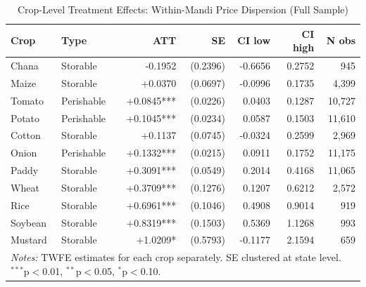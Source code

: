 \begin{table}[htbp]
\centering
\caption{Crop-Level Treatment Effects: Within-Mandi Price Dispersion (Full Sample)}
\label{tab:crop_het}
\begin{tabular}{llrrrrr}
\hline\hline
Crop & Type & ATT & SE & CI low & CI high & N obs \\
\hline
Chana & Storable & -0.1952 & (0.2396) & -0.6656 & 0.2752 & 945 \\
Maize & Storable & +0.0370 & (0.0697) & -0.0996 & 0.1735 & 4,399 \\
Tomato & Perishable & +0.0845*** & (0.0226) & 0.0403 & 0.1287 & 10,727 \\
Potato & Perishable & +0.1045*** & (0.0234) & 0.0587 & 0.1503 & 11,610 \\
Cotton & Storable & +0.1137 & (0.0745) & -0.0324 & 0.2599 & 2,969 \\
Onion & Perishable & +0.1332*** & (0.0215) & 0.0911 & 0.1752 & 11,175 \\
Paddy & Storable & +0.3091*** & (0.0549) & 0.2014 & 0.4168 & 11,065 \\
Wheat & Storable & +0.3709*** & (0.1276) & 0.1207 & 0.6212 & 2,572 \\
Rice & Storable & +0.6961*** & (0.1046) & 0.4908 & 0.9014 & 919 \\
Soybean & Storable & +0.8319*** & (0.1503) & 0.5369 & 1.1268 & 993 \\
Mustard & Storable & +1.0209* & (0.5793) & -0.1177 & 2.1594 & 659 \\
\hline\hline
\multicolumn{7}{l}{\footnotesize \textit{Notes:} TWFE estimates for each crop separately. SE clustered at state level. $^{***}$p$<$0.01, $^{**}$p$<$0.05, $^{*}$p$<$0.10.} \\
\end{tabular}
\end{table}
